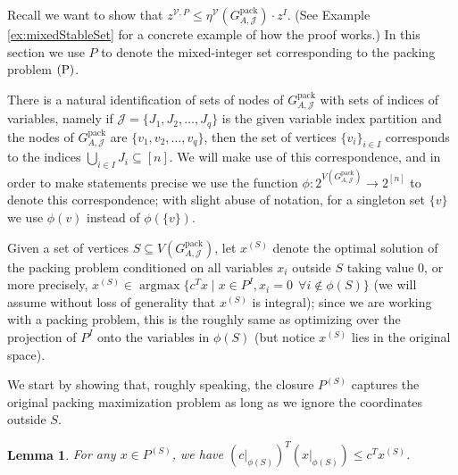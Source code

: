 \documentclass[smallextended]{svjour3}
\newtheorem{lemma}[proposition]{Lemma}
\begin{document}
	Recall we want to show that $z^{{\mathcal{V}},P} \le \eta^{\mathcal{V}}({G^{\textrm{pack}}_{A, {\mathcal{J}}}}) \cdot z^I$. (See Example \ref{ex:mixedStableSet} for a concrete example of how the proof works.) In this section we use $P$ to denote the mixed-integer set corresponding to the packing problem $(\textup{P})$.
	
	There is a natural identification of sets of nodes of ${G^{\textrm{pack}}_{A, {\mathcal{J}}}}$ with sets of indices of variables, namely if ${\mathcal{J}} = \{J_1, J_2, \ldots, J_q\}$ is the given variable index partition and the nodes of ${G^{\textrm{pack}}_{A, {\mathcal{J}}}}$ are $\{v_1, v_2, \ldots, v_q\}$, then the set of vertices $\{v_i\}_{i \in I}$ corresponds to the indices $\bigcup_{i \in I} J_i \subseteq [n]$. We will make use of this correspondence, and in order to make statements precise we use the function $\phi : 2^{V({G^{\textrm{pack}}_{A, {\mathcal{J}}}})} \rightarrow 2^{[n]}$ to denote this correspondence;
with slight abuse of notation, for a singleton set $\{v\}$ we use $\phi(v)$ instead of $\phi(\{v\})$.
	
	Given a set of vertices $S \subseteq V({G^{\textrm{pack}}_{A, {\mathcal{J}}}})$, let $x^{(S)}$ denote the optimal solution of the packing problem conditioned on all variables $x_i$ outside $S$ taking value $0$, or more precisely, $x^{(S)} \in \operatorname{argmax}\{ c^T x \mid x \in P^I, x_i = 0 ~~\forall i \notin \phi(S)\}$ (we will assume without loss of generality that $x^{(S)}$ is integral); since we are working with a packing problem, this is the roughly same as optimizing over the projection of $P^I$ onto the variables in $\phi(S)$ (but notice $x^{(S)}$ lies in the original space).

	We start by showing that, roughly speaking, the closure $P^{(S)}$ captures the original packing maximization problem as long as we ignore the coordinates outside $S$.
	
	\begin{lemma}\label{lemma:pck1New}
		For any $x \in P^{(S)}$, we have $(c|_{\phi(S)})^T (x|_{\phi(S)}) \le c^T x^{(S)}$.
	\end{lemma}
	
\end{document}
